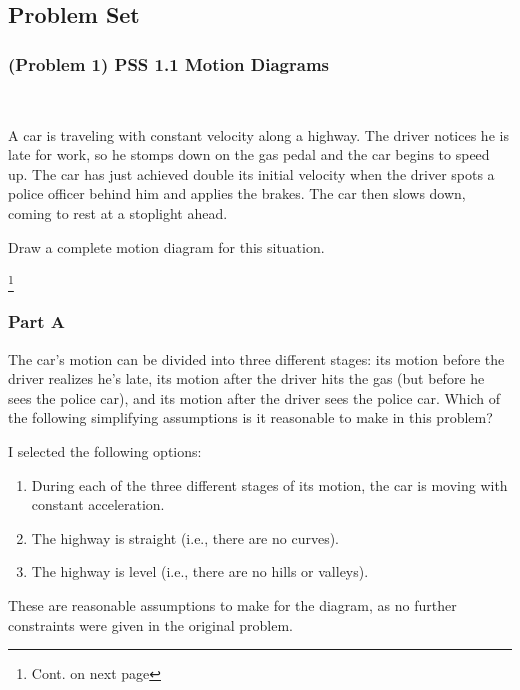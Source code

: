 
\subsection{Problem Set}

\subsubsection{(Problem 1) PSS 1.1 Motion Diagrams}
~
\begin{prb}

	A car is traveling with constant velocity along a highway. The driver notices he is late for work, so he stomps down on the gas pedal and the car begins to speed up. The car has just achieved double its initial velocity when the driver spots a police officer behind him and applies the brakes. The car then slows down, coming to rest at a stoplight ahead.

	Draw a complete motion diagram for this situation.

\end{prb}

\footnote{Cont. on next page}

\newpage

\subsubsection{Part A}

The car's motion can be divided into three different stages: its motion before the driver realizes he's late, its  motion after the driver hits the gas (but before he sees the police car), and its motion after the driver sees the police car. Which of the following simplifying assumptions is it reasonable to make in this problem?

\vspace{1em}

\begin{solution}
	I selected the following options:

	\begin{enumerate}
		\item During each of the three different stages of its motion, the car is moving with constant acceleration.
		\item The highway is straight (i.e., there are no curves).
		\item The highway is level (i.e., there are no hills or valleys).
	\end{enumerate}

	These are reasonable assumptions to make for the diagram, as no further constraints were given in the original problem.

\end{solution}

